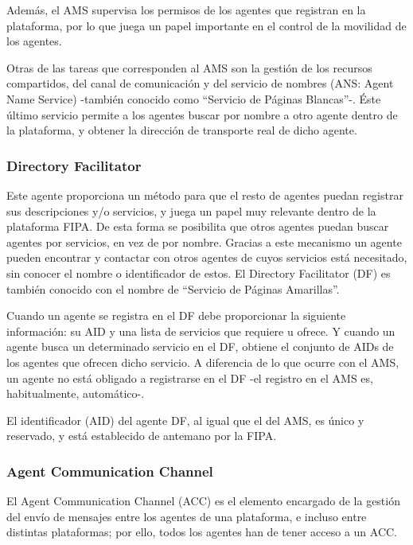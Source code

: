 Además, el AMS supervisa los permisos de los agentes que registran en la
plataforma, por lo que juega un papel importante en el control de la movilidad
de los agentes.

Otras de las tareas que corresponden al AMS son la gestión de los recursos
compartidos, del canal de comunicación y del servicio de nombres (ANS: Agent
Name Service) -también conocido como ``Servicio de Páginas Blancas''-. Éste
último servicio permite a los agentes buscar por nombre a otro agente dentro de
la plataforma, y obtener la dirección de transporte real de dicho agente.

\subsubsection*{Directory Facilitator}

Este agente proporciona un método para que el resto de agentes puedan registrar
sus descripciones y/o servicios, y juega un papel muy relevante dentro de la
plataforma FIPA. De esta forma se posibilita que otros agentes puedan buscar
agentes por servicios, en vez de por nombre. Gracias a este mecanismo un agente
pueden encontrar y contactar con otros agentes de cuyos servicios está
necesitado, sin conocer el nombre o identificador de estos. El Directory
Facilitator (DF) es también conocido con el nombre de ``Servicio de Páginas
Amarillas''.

Cuando un agente se registra en el DF debe proporcionar la siguiente
información: su AID y una lista de servicios que requiere u ofrece. Y cuando un
agente busca un determinado servicio en el DF, obtiene el conjunto de AIDs de
los agentes que ofrecen dicho servicio. A diferencia de lo que ocurre con el
AMS, un agente no está obligado a registrarse en el DF -el registro en el AMS
es, habitualmente, automático-.

El identificador (AID) del agente DF, al igual que el del AMS, es único y
reservado, y está establecido de antemano por la FIPA.

\subsubsection*{Agent Communication Channel}

El Agent Communication Channel (ACC) es el elemento encargado de la gestión del
envío de mensajes entre los agentes de una plataforma, e incluso entre distintas
plataformas; por ello, todos los agentes han de tener acceso a un ACC.

